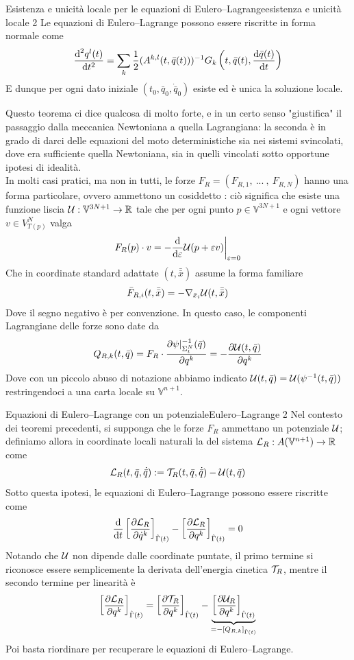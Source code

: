 \documentclass[openany]{book}
\renewcommand\V{\mathbb{V}}
\begin{document}
\begin{corollary}{Esistenza e unicità locale per le equazioni di Eulero--Lagrange}{esistenza e unicità locale 2}
    Le equazioni di Eulero--Lagrange possono essere riscritte in forma normale come
    \[ \frac{\text{d}^2 q^l(t)}{\text{d} t^2} =  \sum_k \frac{1}{2} (A^{k,l}(t,\bar q(t)))^{-1} G_k\left(t, \bar q(t), \frac{\text{d}\bar q(t)}{\text{d} t}\right) \] 
    E dunque per ogni dato iniziale $(t_0,\bar q_0, \dot{\bar q}_0)$ esiste ed è unica la soluzione locale.
\end{corollary}

Questo teorema ci dice qualcosa di molto forte, e in un certo senso "giustifica" il passaggio dalla meccanica Newtoniana a quella Lagrangiana: la seconda è in grado di darci delle equazioni del moto deterministiche sia nei sistemi svincolati, dove era sufficiente quella Newtoniana, sia in quelli vincolati sotto opportune ipotesi di idealità.\\
In molti casi pratici, ma non in tutti, le forze $F_R = (F_{R,1},\ ...\ ,\  F_{R,N})$ hanno una forma particolare, ovvero ammettono un cosiddetto : ciò significa che esiste una funzione liscia $\U : \V^{3N+1}\to\R$ tale che per ogni punto $p \in \V^{3N+1}$ e ogni vettore $v \in V_{T(p)}^N$ valga
\[ F_{R}(p) \cdot v = -\frac{\text{d}}{\text{d}\varepsilon}\mathcal{U}(p+\varepsilon v)\bigg|_{\varepsilon = 0} \]
Che in coordinate standard adattate $(t,\bar{\bar x})$ assume la forma familiare
\[ \bar F_{R,i}(t,\bar{\bar x}) = - \nabla_{\bar x_i} \mathcal{U}(t, \bar{\bar x}) \]
Dove il segno negativo è per convenzione. In questo caso, le componenti Lagrangiane delle forze sono date da
\[ Q_{R,k}(t,\bar q) = F_R \cdot \frac{\partial \psi|_{\Sigma_t^N}^{-1}(\bar q)}{\partial q^k} = -\frac{\partial\mathcal{U}(t,\bar q)}{\partial q^k}\]
Dove con un piccolo abuso di notazione abbiamo indicato $\mathcal{U}(t,\bar q) = \mathcal{U}(\psi^{-1}(t,\bar q))$ restringendoci a una carta locale su $\V^{n+1}$.

\begin{corollary}{Equazioni di Eulero--Lagrange con un potenziale}{Eulero--Lagrange 2}
    Nel contesto dei teoremi precedenti, si supponga che le forze $F_R$ ammettano un potenziale $\mathcal{U}$; definiamo allora in coordinate locali naturali la  del sistema $\L_R : A(\V^{n+1})\to \R$ come
    \[ \mathcal{L}_R(t,\bar q, \dot{\bar q}) := \mathcal{T}_R(t,\bar q, \dot{\bar q}) - \mathcal{U}(t, \bar q) \]
    Sotto questa ipotesi, le equazioni di Eulero--Lagrange possono essere riscritte come
    \[ \frac{\text{d}}{\text{d} t}\left[ \frac{\partial \mathcal{L}_R}{\partial \dot q^k} \right]_{\hat\Gamma(t)} - \left[ \frac{\partial \mathcal{L}_R}{\partial q^k} \right]_{\hat\Gamma(t)} = 0\]
    \proof 
    Notando che $\mathcal{U}$ non dipende dalle coordinate puntate, il primo termine si riconosce essere semplicemente la derivata dell'energia cinetica $\mathcal{T}_R$, mentre il secondo termine per linearità è
    \[ \left[ \frac{\partial \mathcal{L}_R}{\partial q^k} \right]_{\hat\Gamma(t)} = \left[ \frac{\partial \mathcal{T}_R}{\partial q^k} \right]_{\hat\Gamma(t)} - \underbrace{\left[ \frac{\partial \mathcal{U}_R}{\partial q^k} \right]_{\hat\Gamma(t)}}_{= - [Q_{R,k}]_{\hat\Gamma(t)}} \]
    Poi basta riordinare per recuperare le equazioni di Eulero--Lagrange.
\end{corollary}
\end{document}
